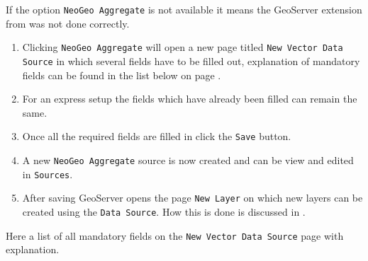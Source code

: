 \noindent If the option \lstinline|NeoGeo Aggregate| is not available it means the GeoServer extension from  was not done correctly.

\begin{enumerate}[resume]
	\item Clicking \lstinline|NeoGeo Aggregate| will open a new page titled \lstinline|New Vector Data Source| in which several fields have to be filled out, explanation of mandatory fields can be found in the list below on page \pageref{list:manditory}.
	\item For an express setup the fields which have already been filled can remain the same.
	\item Once all the required fields are filled in click the \lstinline|Save| button.
	\item A new \lstinline|NeoGeo Aggregate| source is now created and can be view and edited in \lstinline|Sources|.
	\item After saving GeoServer opens the page \lstinline|New Layer| on which new layers can be created using the \lstinline|Data Source|. How this is done is discussed in .
\end{enumerate}

\noindent Here a list of all mandatory fields on the \lstinline|New Vector Data Source| page with explanation.

